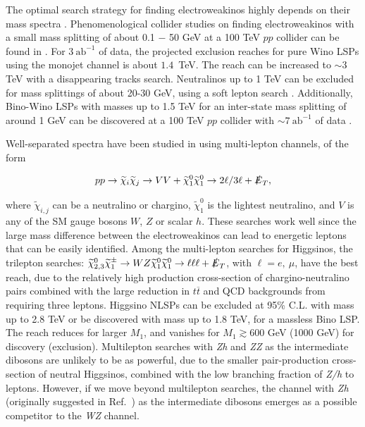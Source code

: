 \documentclass[a4paper,11pt]{article}
\newcommand{\N}{\widetilde{\chi}^0}
\newcommand{\C}{\widetilde{\chi}^\pm}
\newcommand{\met}{{\slashed{E}_T}}
\begin{document}
The optimal search strategy for finding electroweakinos   highly depends on
their mass spectra \cite{Han:2013kza}.  Phenomenological collider studies on
finding electroweakinos with a small mass splitting of about 0.1 $-$ 50 GeV at a
100 TeV $pp$  collider can be found in \cite{Low:2014cba, Bramante:2014tba,
Berlin:2015aba, Cirelli:2014dsa}.
For $3\ \text{ab}^{-1}$ of data, the projected exclusion reaches for pure Wino
LSPs using the monojet channel is about $1.4$~TeV.  The reach
can be increased to $\sim3$ TeV with a disappearing tracks search.
Neutralinos up to 1 TeV can be excluded for mass splittings of about 20-30 GeV,
using a soft lepton search \cite{Low:2014cba}. Additionally, Bino-Wino LSPs
with masses up to 1.5 TeV for an inter-state mass splitting of around 1 GeV  can be
discovered at a 100 TeV $pp$ collider with $\sim7\ \text{ab}^{-1}$
of data \cite{Bramante:2014tba}.

Well-separated spectra have been studied in \cite{Gori:2014oua,
Acharya:2014pua} using multi-lepton channels, of the form 

\begin{align}
  pp\rightarrow \widetilde{\chi}_i\widetilde{\chi}_j\rightarrow VV +
  \N_1\N_1\rightarrow 2\ell/3\ell + \met,
\end{align} 

\noindent where $\widetilde{\chi}_{i,j}$ can be a neutralino or chargino, $\N_1$
is the lightest neutralino, and $V$ is any of the SM gauge bosons $W$, $Z$
or scalar $h$.  These searches work well since the large mass difference
between the electroweakinos can lead to energetic leptons that can be easily
identified. Among the multi-lepton searches for Higgsinos, the trilepton
searches: $\N_{2,3}\C_1\rightarrow WZ\N_1\N_1\rightarrow \ell\ell\ell +
\met$, with $\ell=e, \ \mu$,  have the best reach, due to the relatively high
production cross-section of chargino-neutralino pairs combined with the large
reduction in $t\overline{t}$ and QCD backgrounds from requiring three
leptons.  Higgsino NLSPs can be excluded at 95\% C.L. with mass up to 2.8 TeV
or be discovered with  mass up to 1.8 TeV, for a massless Bino LSP.   The reach
reduces for larger $M_1$, and vanishes for $M_1\gtrsim 600$ GeV (1000 GeV)
for discovery (exclusion).  Multilepton searches with \emph{Zh} and \emph{ZZ}
as the intermediate dibosons are unlikely to be as powerful, due to the smaller
pair-production cross-section of neutral Higgsinos, combined with the low
branching fraction of \emph{Z/h} to leptons. However, if we move beyond
multilepton searches, the channel with \emph{Zh} (originally suggested in
Ref.~\cite{Han:2013kza}) as the intermediate dibosons emerges as a possible
competitor to the \emph{WZ} channel.  
\end{document}

